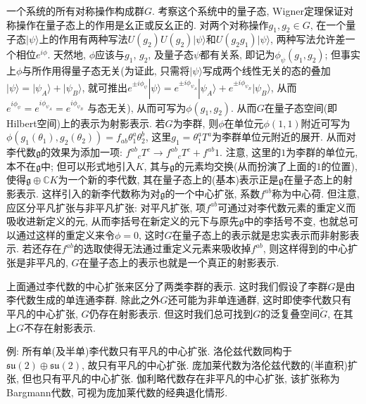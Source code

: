 \documentclass{ctexart}%
\theoremstyle{definition}
\theoremstyle{remark}
\begin{document}
一个系统的所有对称操作构成群$G$. 考察这个系统中的量子态, Wigner定理保证对称操作在量子态上的作用是幺正或反幺正的. 对两个对称操作$g_1,g_2\in G$, 在一个量子态$|\psi\rangle$上的作用有两种写法$U(g_2)U(g_2)|\psi\rangle$和$U(g_2g_1)|\psi\rangle$, 两种写法允许差一个相位$e^{i\phi}$. 天然地, $\phi$应该与$g_1$, $g_2$, 及量子态$\psi$都有关系, 即记为$\phi_\psi(g_1,g_2)$; 但事实上$\phi$与所作用得量子态无关(为证此, 只需将$|\psi\rangle$写成两个线性无关的态的叠加$|\psi\rangle = |\psi_A\rangle +|\psi_B\rangle$, 就可推出$e^{\pm i\phi_{\psi}} |\psi\rangle = e^{\pm i \phi_{\psi_A}}|\psi_A\rangle+e^{\pm i \phi_{\psi_B}}|\psi_B\rangle$, 从而$e^{i\phi_{\psi}} = e^{i\phi_{\psi_A}} = e^{i\phi_{\psi_B}}$ 与态无关), 从而可写为$\phi(g_1,g_2)$. 从而$G$在量子态空间(即Hilbert空间)上的表示为射影表示. 若$G$为李群, 则$\phi$在单位元$\phi(1,1)$附近可写为$\phi(g_1(\theta_1),g_2(\theta_2)) = f_{ab} \theta^a_1 \theta^b_2$, 这里$g_1=\theta_1^a T^a$为李群单位元附近的展开. 从而对李代数$\mathfrak{g}$的效果为添加一项: $f^{ab}{}_c T^c\rightarrow f^{ab}{}_c T^c + f^{ab} 1$. 注意, 这里的$1$为李群的单位元, 本不在$\mathfrak{g}$中; 但可以形式地引入$K$, 其与$\mathfrak{g}$的元素均交换(从而扮演了上面的$1$的位置), 使得$\mathfrak{g}\oplus\mathbb{C} K$为一个新的李代数, 其在量子态上的(基本)表示正是$\mathfrak{g}$在量子态上的射影表示. 这样引入的新李代数称为对$\mathfrak{g}$的一个中心扩张, 系数$f^{ab}$称为中心荷. 但注意, 应区分平凡扩张与非平凡扩张: 对平凡扩张, 项$f^{ab}$可通过对李代数元素的重定义而吸收进新定义的元, 从而李括号在新定义的元下与原先$\mathfrak{g}$中的李括号不变, 也就总可以通过这样的重定义来令$\phi=0$, 这时$G$在量子态上的表示就是忠实表示而非射影表示. 若还存在$f^{ab}$的选取使得无法通过重定义元素来吸收掉$f^{ab}$, 则这样得到的中心扩张是非平凡的, $G$在量子态上的表示也就是一个真正的射影表示.

上面通过李代数的中心扩张来区分了两类李群的表示. 这时我们假设了李群$G$是由李代数生成的单连通李群. 除此之外$G$还可能为非单连通群, 这时即使李代数只有平凡的中心扩张, $G$仍存在射影表示. 但这时我们总可找到$G$的泛复叠空间$\widetilde{G}$, 在其上$G$不存在射影表示. 

例: 所有单(及半单)李代数只有平凡的中心扩张. 洛伦兹代数同构于$\mathfrak{su}(2)\oplus \mathfrak{su}(2)$, 故只有平凡的中心扩张. 庞加莱代数为洛伦兹代数的(半直积)扩张, 但也只有平凡的中心扩张. 伽利略代数存在非平凡的中心扩张, 该扩张称为Bargmann代数, 可视为庞加莱代数的经典退化情形.
\end{document}
